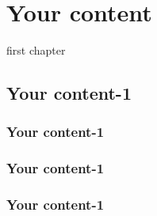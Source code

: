 \chapter{Your content}

first chapter

\section{Your content-1}
%

\subsection{Your content-1}
\subsection{Your content-1}
\subsection{Your content-1}
